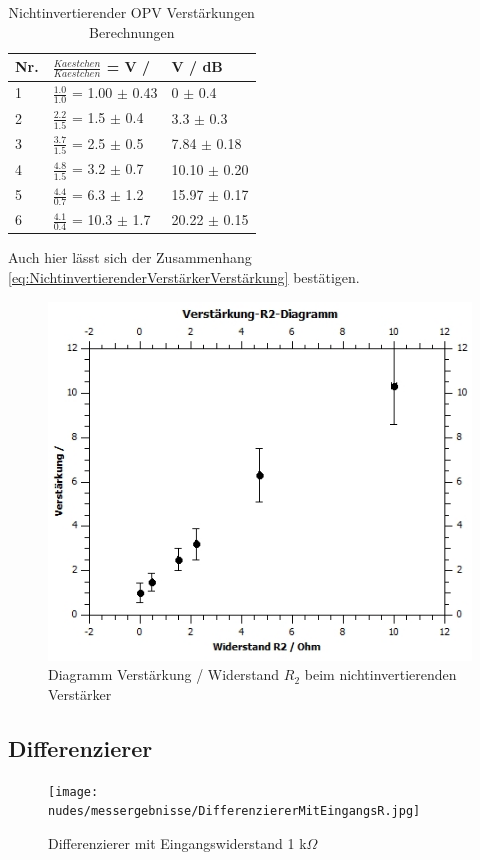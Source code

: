 \documentclass[12pt,a4paper,twoside]{article}
\begin{document}
\begin{table}[H]
    \centering
    \caption{Nichtinvertierender OPV Verstärkungen Berechnungen}
    \label{tab:NioVerstärkungenBerechnetAW}
    \begin{tabular}{| l | l | l |}
        \hline
        Nr. & $\frac{Kaestchen}{Kaestchen}$ = V / & V / dB \\
        \hline
        1 & $\frac{1.0}{1.0}$ =  1.00 $\pm$ 0.43 & 0    $\pm$ 0.4 \\
        2 & $\frac{2.2}{1.5}$ =  1.5 $\pm$ 0.4 & 3.3 $\pm$ 0.3 \\
        3 & $\frac{3.7}{1.5}$ =  2.5 $\pm$ 0.5 & 7.84 $\pm$ 0.18 \\
        4 & $\frac{4.8}{1.5}$ =  3.2 $\pm$ 0.7 & 10.10 $\pm$ 0.20 \\
        5 & $\frac{4.4}{0.7}$ =  6.3 $\pm$ 1.2 & 15.97 $\pm$ 0.17 \\
        6 & $\frac{4.1}{0.4}$ = 10.3 $\pm$ 1.7 & 20.22 $\pm$ 0.15 \\
        \hline
    \end{tabular}
\end{table}

\noindent
Auch hier lässt sich der Zusammenhang \ref{eq:NichtinvertierenderVerstärkerVerstärkung} bestätigen.

\begin{figure}[H]
    \centering
    \includegraphics[width=0.5\linewidth]{nudes/NivVerstärkungR2Diagramm.jpg}
    \caption{Diagramm Verstärkung / Widerstand $R_{2}$ beim nichtinvertierenden Verstärker}
    \label{fig:Verstärkung/R2NIVAW}
\end{figure}

\subsection{Differenzierer}

\begin{figure}[H]
    \centering
    \texttt{[image: nudes/messergebnisse/DifferenziererMitEingangsR.jpg]}
    \caption{Differenzierer mit Eingangswiderstand 1 k$\Omega$}
    \label{fig:Differenzierer1R1AW}
\end{figure}
\end{document}
